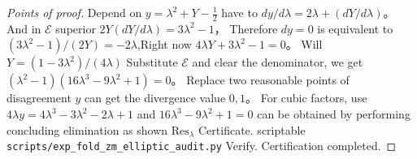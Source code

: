 \begin{proof}[Points of proof]
Depend on \(y=\lambda^{2}+Y-\tfrac12\) have to
\(
dy/d\lambda=2\lambda+(dY/d\lambda)
\)。
And in \(\mathcal{E}\) superior \(2Y(dY/d\lambda)=3\lambda^{2}-1\)，
Therefore \(dy=0\) is equivalent to \((3\lambda^{2}-1)/(2Y)=-2\lambda\),Right now \(4\lambda Y+3\lambda^{2}-1=0\)。
Will \(Y=(1-3\lambda^{2})/(4\lambda)\) Substitute \(\mathcal{E}\) and clear the denominator, we get
\(
(\lambda^{2}-1)(16\lambda^{3}-9\lambda^{2}+1)=0
\)。
Replace two reasonable points of disagreement \(y\) can get the divergence value \(0,1\)。
For cubic factors, use \(4\lambda y=4\lambda^{3}-3\lambda^{2}-2\lambda+1\) and \(16\lambda^{3}-9\lambda^{2}+1=0\) can be obtained by performing concluding elimination as shown \(\mathrm{Res}_{\lambda}\) Certificate.
scriptable \texttt{scripts/exp\_fold\_zm\_elliptic\_audit.py} Verify. Certification completed.
\end{proof}



